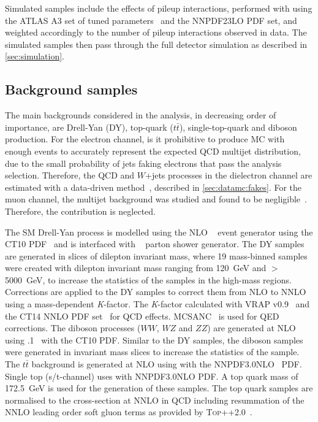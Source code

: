 Simulated samples include the effects of pileup interactions, performed with  using the ATLAS A3 set of tuned parameters~\cite{ATL-PHYS-PUB-2016-017} and the NNPDF23LO PDF set, and weighted accordingly to the number of pileup interactions observed in data. The simulated samples then pass through the full detector simulation as described in \cref{sec:simulation}. 

\subsection{Background samples}\label{sec:datamc:mc:bkg}
The main backgrounds considered in the analysis, in decreasing order of importance, are Drell-Yan (DY), top-quark ($t\bar{t}$), single-top-quark and diboson production. For the electron channel, is it prohibitive to produce MC with enough events to accurately represent the expected QCD multijet distribution, due to the small probability of jets faking electrons that pass the analysis selection. Therefore, the QCD and $W$+jets processes in the dielectron channel are estimated with a data-driven method~\cite{EXOT-2016-05}, described in \cref{sec:datamc:fakes}. For the muon channel, the multijet background was studied and found to be negligible~\cite{EXOT-2016-05}. Therefore, the contribution is neglected. 

The SM Drell-Yan process is modelled using the NLO \POWHEGBOX~\cite{Alioli:2010xd,Frixione:2007vw} event generator using the CT10 PDF~\cite{ct10} and is interfaced with ~\cite{pythia8} parton shower generator. The DY samples are generated in slices of dilepton invariant mass, where 19 mass-binned samples were created with dilepton invariant mass ranging from \SI{120}{\giga\electronvolt} and $>$ \SI{5000}{\giga\electronvolt}, to increase the statistics of the samples in the high-mass regions. Corrections are applied to the DY samples to correct them from NLO to NNLO using a mass-dependent \emph{K}-factor. The \emph{K}-factor calculated with {\textsc{VRAP}} v0.9~\cite{vrap} and the CT14 NNLO PDF set~\cite{CT14} for QCD effects. {\textsc{MCSANC}}~\cite{MCSANC} is used for QED corrections. The diboson processes ($WW$, $WZ$ and $ZZ$) are generated at NLO using .1~\cite{Gleisberg:2008ta} with the CT10 PDF. Similar to the DY samples, the diboson samples were generated in invariant mass slices to increase the statistics of the sample. The $t\bar{t}$ background is generated at NLO using \POWHEGBOX with the NNPDF3.0NLO~\cite{Ball:2014uwa} PDF. Single top (s/t-channel) uses \POWHEGBOX with NNPDF3.0NLO PDF. A top quark mass of \SI{172.5}{\giga\electronvolt} is used for the generation of these samples. The top quark samples are normalised to the cross-section at NNLO in QCD including resummation of the NNLO leading order soft gluon terms as provided by \textsc{Top++}2.0~\cite{Czakon:2011xx}.

